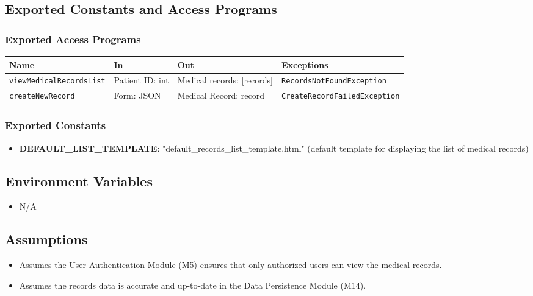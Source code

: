 \documentclass[12pt, titlepage]{article}
\begin{document}
\subsection{Exported Constants and Access Programs}
\subsubsection{Exported Access Programs}
\begin{tabular}{|l|l|p{3cm}|p{6cm}|}
    \hline
    \textbf{Name} & \textbf{In} & \textbf{Out} & \textbf{Exceptions} \\
    \hline 
    \texttt{viewMedicalRecordsList} & Patient ID: int & Medical records: [records] & \texttt{RecordsNotFoundException} \\
    \hline
    \texttt{createNewRecord} & Form: JSON & Medical Record: record & \texttt{CreateRecordFailedException} \\
    \hline
\end{tabular}

\subsubsection{Exported Constants}
\begin{itemize}
\item \textbf{DEFAULT\_LIST\_TEMPLATE}: "default\_records\_list\_template.html" (default template for displaying the list of medical records)
\end{itemize}

\subsection{Environment Variables}
\begin{itemize}
\item N/A
\end{itemize}

\subsection{Assumptions}
\begin{itemize}
\item Assumes the User Authentication Module (M5) ensures that only authorized users can view the medical records.
\item Assumes the records data is accurate and up-to-date in the Data Persistence Module (M14).
\end{itemize}
\end{document}
